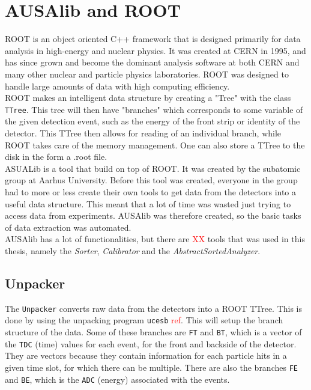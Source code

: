 \section{AUSAlib and ROOT}
ROOT is an object oriented C++ framework that is designed primarily for data analysis in high-energy and nuclear physics. It was created at CERN in 1995, and has since grown and become the dominant analysis software at both CERN and many other nuclear and particle physics laboratories. 
ROOT was designed to handle large amounts of data with high computing efficiency. \\
ROOT makes an intelligent data structure by creating a "Tree" with the class \texttt{TTree}. This tree will then have "branches" which corresponds to some variable of the given detection event, such as the energy of the front strip or identity of the detector. This TTree then allows for reading of an individual branch, while ROOT takes care of the memory management. One can also store a TTree to the disk in the form a .root file. \\

ASUALib is a tool that build on top of ROOT. It was created by the subatomic group at Aarhus University.
Before this tool was created, everyone in the group had to more or less create their own tools to get data from the detectors into a useful data structure. This meant that a lot of time was wasted just trying to access data from experiments. AUSAlib was therefore created, so the basic tasks of data extraction was automated. \\
AUSAlib has a lot of functionalities, but there are \textcolor{red}{XX} tools that was used in this thesis, namely the \textit{Sorter}, \textit{Calibrator} and the \textit{AbstractSortedAnalyzer}.

\subsection{Unpacker}
The \texttt{Unpacker} converts raw data from the detectors into a ROOT TTree. This is done by using the unpacking program \texttt{ucesb} \textcolor{red}{ref}. This will setup the branch structure of the data. Some of these branches are \texttt{FT} and \texttt{BT}, which is a vector of the  \texttt{TDC} (time) values for each event, for the front and backside of the detector. They are vectors because they contain information for each particle hits in a given time slot, for which there can be multiple. 
There are also the branches \texttt{FE} and \texttt{BE}, which is the \texttt{ADC} (energy) associated with the events. 

